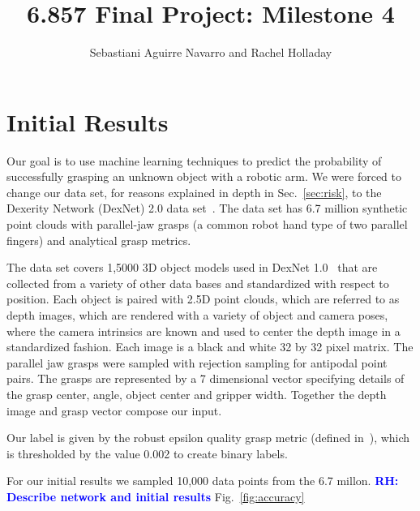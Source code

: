 \documentclass[letterpaper, 10 pt]{article}
\newcommand{\sref}[1]{Sec.~\ref{#1}} %
\newcommand{\figref}[1]{Fig.~\ref{#1}} %
\newcommand{\rhnote}[1]{\ifthenelse{\boolean{include-notes}}%
 {\textcolor{blue}{\textbf{RH: #1}}}{}}
\begin{document}
\title{6.857 Final Project: Milestone 4}
\author{Sebastiani Aguirre Navarro and Rachel Holladay}
\maketitle

\section{Initial Results}
\label{sec:results}

Our goal is to use machine learning techniques to predict the probability of successfully grasping an unknown object with a robotic arm.
We were forced to change our data set, for reasons explained in depth in \sref{sec:risk}, to the Dexerity Network (DexNet) 2.0 data set~\cite{mahler2017dex}.
The data set has 6.7 million synthetic point clouds with parallel-jaw grasps (a common robot hand type of two parallel fingers) and analytical grasp metrics. 

The data set covers 1,5000 3D object models used in DexNet 1.0~\cite{mahler2016dex} that are collected from a variety of other data bases and standardized with respect to position. 
Each object is paired with 2.5D point clouds, which are referred to as depth images, which are rendered with a variety of object and camera poses, where the camera intrinsics are known and used to center the depth image in a standardized fashion.
Each image is a black and white 32 by 32 pixel matrix. 
The parallel jaw grasps were sampled with rejection sampling for antipodal point pairs. 
The grasps are represented by a 7 dimensional vector specifying details of the grasp center, angle, object center and gripper width. 
Together the depth image and grasp vector compose our input. 

Our label is given by the robust epsilon quality grasp metric (defined in~\cite{seita2016large}), which is thresholded by the value 0.002 to create binary labels.

For our initial results we sampled 10,000 data points from the 6.7 millon. 
\rhnote{Describe network and initial results} \figref{fig:accuracy}
\end{document}
